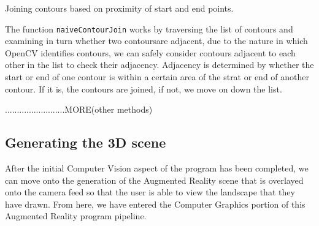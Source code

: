\documentclass[11pt]{article}
\begin{document}
\begin{algorithm}
\DontPrintSemicolon
{}
\caption{Joining contours based on proximity of start and end points.}
\label{algo:naivecontourjoin}
\end{algorithm}

The function \texttt{naiveContourJoin} works by traversing the list of 
contours and examining in turn whether two contoursare adjacent, due to 
the nature in which OpenCV identifies contours, we can safely consider 
contours adjacent to each other in the list to check their adjacency. 
Adjacency is determined by whether the start or end of one contour is within
a certain area of the strat or end of another contour. If it is, the 
contours are joined, if not, we move on down the list.

.........................MORE(other methods)




\subsection{Generating the 3D scene}
After the initial Computer Vision aspect of the program has been completed,
we can move onto the generation of the Augmented Reality scene that is
overlayed onto the camera feed so that the user is able to view the
landscape that they have drawn. From here, we have entered the Computer
Graphics portion of this Augmented Reality program pipeline.
\end{document}
